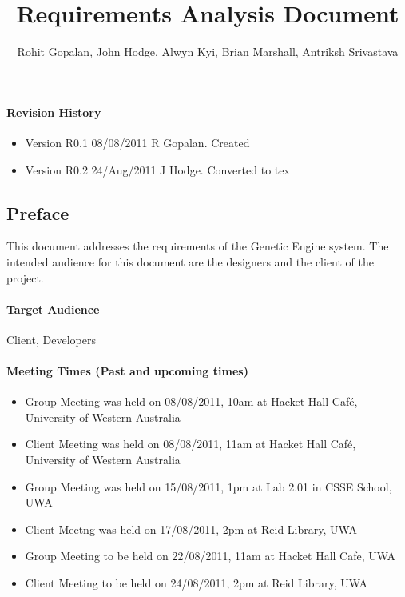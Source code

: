 
\title{Requirements Analysis Document}
\author{Rohit Gopalan, John Hodge, Alwyn Kyi, Brian Marshall, Antriksh Srivastava}



\maketitle

\tableofcontents

\clearpage

\paragraph*{Revision History}
\begin{itemize}
\item Version R0.1 08/08/2011 R Gopalan. Created
\item Version R0.2 24/Aug/2011 J Hodge. Converted to tex
\end{itemize}

\subsection*{Preface}
This document addresses the requirements of the Genetic Engine system. The intended audience for this document are the designers and the client of the project.

\paragraph*{Target Audience}
Client, Developers

\paragraph*{Meeting Times (Past and upcoming times)}
\begin{itemize}
\item Group Meeting was held on 08/08/2011, 10am at Hacket Hall Café, University of Western Australia
\item Client Meeting was held on 08/08/2011, 11am at Hacket Hall Café, University of Western Australia
\item Group Meeting was held on 15/08/2011, 1pm at Lab 2.01 in CSSE School, UWA
\item Client Meetng was held on 17/08/2011, 2pm at Reid Library, UWA
\item Group Meeting to be held on 22/08/2011, 11am at Hacket Hall Cafe, UWA
\item Client Meeting to be held on 24/08/2011, 2pm at Reid Library, UWA
\end{itemize}

